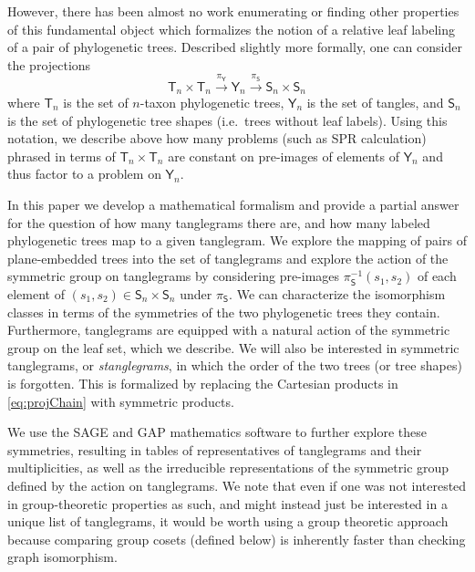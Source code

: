 \documentclass{amsart}
\newcommand{\tree}{\mathsf{T}}
\newcommand{\shape}{\mathsf{S}}
\newcommand{\tangle}{\mathsf{Y}}
\begin{document}
However, there has been almost no work enumerating or finding other properties of this fundamental object which formalizes the notion of a relative leaf labeling of a pair of phylogenetic trees.
Described slightly more formally, one can consider the projections
\begin{equation}
\label{eq:projChain}
\tree_n \times \tree_n \xrightarrow{\pi_\tangle} \tangle_n \xrightarrow{\pi_\shape} \shape_n \times \shape_n
\end{equation}
where $\tree_n$ is the set of $n$-taxon phylogenetic trees, $\tangle_n$ is the set of tangles, and $\shape_n$ is the set of phylogenetic tree shapes (i.e.\ trees without leaf labels).
Using this notation, we describe above how many problems (such as SPR calculation) phrased in terms of $\tree_n \times \tree_n$ are constant on pre-images of elements of $\tangle_n$ and thus factor to a problem on $\tangle_n$.

In this paper we develop a mathematical formalism and provide a partial answer for the question of how many tanglegrams there are, and how many labeled phylogenetic trees map to a given tanglegram.
We explore the mapping of pairs of plane-embedded trees into the set of tanglegrams and explore the action of the symmetric group on tanglegrams by considering pre-images $\pi_\shape^{-1}(s_1, s_2)$ of each element of $(s_1, s_2) \in \shape_n \times \shape_n$ under $\pi_\shape$.
We can characterize the isomorphism classes in terms of the symmetries of the two phylogenetic trees they contain.
Furthermore, tanglegrams are equipped with a natural action of the symmetric group on the leaf set, which we describe.
We will also be interested in symmetric tanglegrams, or \emph{stanglegrams}, in which the order of the two trees (or tree shapes) is forgotten.
This is formalized by replacing the Cartesian products in \eqref{eq:projChain} with symmetric products.

We use the SAGE \cite{SteinJoyner2005} and GAP \cite{GAP4} mathematics software to further explore these symmetries, resulting in tables of representatives of tanglegrams and their multiplicities, as well as the irreducible representations of the symmetric group defined by the action on tanglegrams.
We note that even if one was not interested in group-theoretic properties as such, and might instead just be interested in a unique list of tanglegrams, it would be worth using a group theoretic approach because comparing group cosets (defined below) is inherently faster than checking graph isomorphism.
\end{document}
